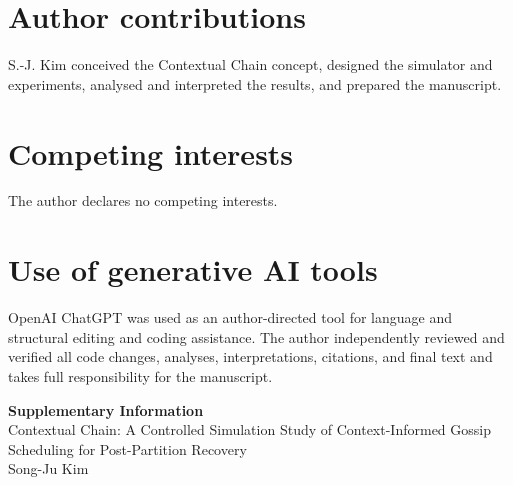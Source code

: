 \documentclass[11pt]{article}
\begin{document}
\section*{Author contributions}
S.-J. Kim conceived the Contextual Chain concept, designed the simulator and experiments, analysed and interpreted the results, and prepared the manuscript.

\section*{Competing interests}
The author declares no competing interests.

\section*{Use of generative AI tools}
OpenAI ChatGPT was used as an author-directed tool for language and structural editing and coding assistance. The author independently reviewed and verified all code changes, analyses, interpretations, citations, and final text and takes full responsibility for the manuscript.




\clearpage
\begin{center}
{\Large\bfseries Supplementary Information}\\[0.5em]
{\large Contextual Chain: A Controlled Simulation Study of Context-Informed Gossip Scheduling for Post-Partition Recovery}\\[0.5em]
Song-Ju Kim
\end{center}
\vspace{1em}

\setcounter{section}{0}
\setcounter{subsection}{0}
\setcounter{table}{0}
\setcounter{figure}{0}
\renewcommand{\thesection}{S\arabic{section}}
\renewcommand{\thesubsection}{S\arabic{section}.\arabic{subsection}}
\renewcommand{\thetable}{S\arabic{table}}
\renewcommand{\thefigure}{S\arabic{figure}}
\renewcommand{\theHsection}{S\arabic{section}}
\renewcommand{\theHsubsection}{S\arabic{section}.\arabic{subsection}}
\renewcommand{\theHtable}{S\arabic{table}}
\renewcommand{\theHfigure}{S\arabic{figure}}
\end{document}
